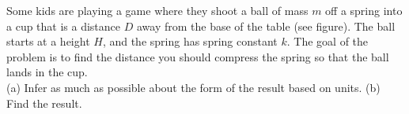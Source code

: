 Some kids are playing a game where they shoot a ball of mass $m$
off a spring into a cup that is a distance $D$ away from the base of
the table (see figure). The ball starts at a height $H$, and the
spring has spring constant $k$.  The goal of the problem is to find the distance you should
compress the spring so that the ball lands in the cup.\\
%
(a) Infer as much as possible about the form of the result based on units.\hwendpart
%
(b) Find the result.\answercheck

